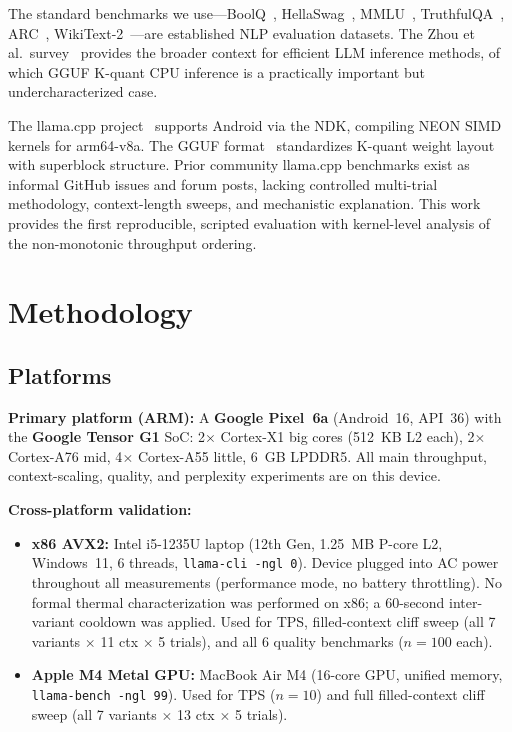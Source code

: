 \documentclass[conference]{IEEEtran}
\begin{document}
The standard benchmarks we use---BoolQ~\cite{boolq}, HellaSwag~\cite{hellaswag},
MMLU~\cite{mmlu}, TruthfulQA~\cite{truthfulqa}, ARC~\cite{arc},
WikiText-2~\cite{wikitext2}---are established NLP evaluation datasets.
The Zhou et al.\ survey~\cite{zhou_survey} provides the broader context for
efficient LLM inference methods, of which GGUF K-quant CPU inference is a
practically important but undercharacterized case.

The llama.cpp project~\cite{llamacpp} supports Android via the NDK, compiling
NEON SIMD kernels for arm64-v8a. The GGUF format~\cite{gguf} standardizes
K-quant weight layout with superblock structure.
Prior community llama.cpp benchmarks exist as informal GitHub issues and forum
posts, lacking controlled multi-trial methodology, context-length sweeps, and
mechanistic explanation. This work provides the first reproducible, scripted
evaluation with kernel-level analysis of the non-monotonic throughput ordering.

\section{Methodology}\label{sec:methodology}

\subsection{Platforms}

\textbf{Primary platform (ARM):} A \textbf{Google Pixel~6a} (Android~16, API~36) with
the \textbf{Google Tensor G1} SoC: 2$\times$ Cortex-X1 big cores (512~KB L2 each),
2$\times$ Cortex-A76 mid, 4$\times$ Cortex-A55 little, 6~GB LPDDR5.
All main throughput, context-scaling, quality, and perplexity experiments are on this device.

\textbf{Cross-platform validation:}
\begin{itemize}[nosep]
  \item \textbf{x86 AVX2:} Intel i5-1235U laptop (12th Gen, 1.25~MB P-core L2,
    Windows~11, 6 threads, \texttt{llama-cli -ngl~0}).
    Device plugged into AC power throughout all measurements (performance mode, no
    battery throttling). No formal thermal characterization was performed on x86;
    a 60-second inter-variant cooldown was applied.
    Used for TPS, filled-context cliff sweep (all 7 variants $\times$ 11 ctx
    $\times$ 5 trials), and all 6 quality benchmarks ($n{=}100$ each).
  \item \textbf{Apple M4 Metal GPU:} MacBook Air M4 (16-core GPU, unified memory,
    \texttt{llama-bench -ngl~99}). Used for TPS ($n{=}10$) and full filled-context
    cliff sweep (all 7 variants $\times$ 13 ctx $\times$ 5 trials).
\end{itemize}
\end{document}
